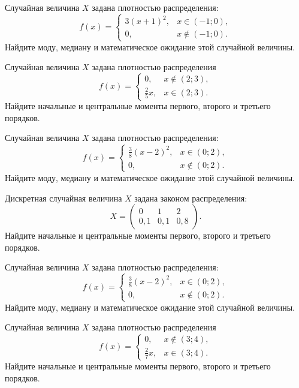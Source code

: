\vfill

\newpage\setcounter{zad}{0}

\z Случайная величина $X$ задана плотностью распределения: $$f(x) = \begin{cases} 3(x+1)^2, & x \in (-1; 0), \\ 0, & x \not\in (-1; 0). \end{cases}$$ Найдите моду, медиану и математическое ожидание этой случайной величины.


\vfill

\z Случайная величина $X$ задана плотностью распределения $$f(x) = \begin{cases}0, & x\not\in(2; 3), \\ \frac{2}{5}x, & x\in(2; 3).\end{cases}$$ Найдите начальные и центральные моменты первого, второго и третьего порядков.
 

\vfill

\newpage\setcounter{zad}{0}

\z Случайная величина $X$ задана плотностью распределения: $$f(x) = \begin{cases} \frac{3}{8}(x-2)^2, & x \in (0; 2), \\ 0, & x \not\in (0; 2). \end{cases}$$ Найдите моду, медиану и математическое ожидание этой случайной величины.


\vfill

\z Дискретная случайная величина $X$ задана законом распределения: $$ X = \left(\begin{array}{rrr}0 & 1 & 2\\0{,}1 & 0{,}1 & 0{,}8\end{array}\right).$$ Найдите начальные и центральные моменты первого, второго и третьего порядков.
 

\vfill

\newpage\setcounter{zad}{0}

\z Случайная величина $X$ задана плотностью распределения: $$f(x) = \begin{cases} \frac{3}{8}(x-2)^2, & x \in (0; 2), \\ 0, & x \not\in (0; 2). \end{cases}$$ Найдите моду, медиану и математическое ожидание этой случайной величины.


\vfill

\z Случайная величина $X$ задана плотностью распределения $$f(x) = \begin{cases}0, & x\not\in(3; 4), \\ \frac{2}{7}x, & x\in(3; 4).\end{cases}$$ Найдите начальные и центральные моменты первого, второго и третьего порядков.
 

